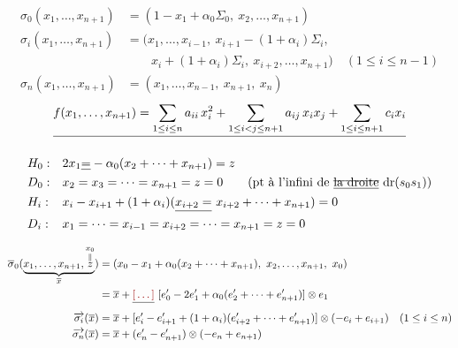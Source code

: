 \documentclass[11pt,a4paper]{article}
\begin{document}
\[
\begin{aligned}
\sigma_0(x_1, \dots, x_{n+1}) &= (1 - x_1 + \alpha_0\Sigma_0,\ x_2, \dots, x_{n+1})\\
\sigma_i(x_1, \dots, x_{n+1}) &= (x_1, \dots, x_{i-1},\ x_{i+1} - (1+\alpha_i)\Sigma_i,\\
&\qquad x_i + (1+\alpha_i)\Sigma_i,\ x_{i+2}, \dots, x_{n+1}) \quad (1\le i\le n-1)\\
\sigma_n(x_1, \dots, x_{n+1}) &= (x_1, \dots, x_{n-1},\ x_{n+1},\ x_n)
\end{aligned}
\]
\[
\struck{f(x_1, \dots, x_{n+1}) = \sum_{1\le i\le n} a_{ii}\, x_i^2 + \sum_{1\le i<j\le n+1} a_{ij}\, x_i x_j + \sum_{1\le i\le n+1} c_i x_i}
\]

\[
\begin{array}{ll}
H_0 : & 2x_1 \struck{=} - \alpha_0(x_2 + \cdots + x_{n+1}) = z\\
D_0 : & x_2 = x_3 = \cdots = x_{n+1} = z = 0 \qquad (\text{pt à l'infini de } \struck{\text{\uncertain{la droite}}}\ \mathrm{dr}(s_0 s_1))\\[4pt]
H_i : & x_i - x_{i+1} + (1+\alpha_i)(\struck{x_{i+2} =}\ x_{i+2} + \cdots + x_{n+1}) = 0\\
D_i : & x_1 = \cdots = x_{i-1} = x_{i+2} = \cdots = x_{n+1} = z = 0
\end{array}
\]

\[
\begin{aligned}
\overline{\sigma}_0(\underbrace{x_1, \dots, x_{n+1}, \overset{x_0}{\overset{\|}{z}}}_{\overline{x}}) &= (x_0 - x_1 + \alpha_0(x_2 + \cdots + x_{n+1}),\ x_2, \dots, x_{n+1},\ x_0)\\
&= \overline{x} + \struck{\ill{}}\ [e'_0 - 2e'_1 + \alpha_0(e'_2 + \cdots + e'_{n+1})] \otimes e_1\\
\overrightarrow{\sigma_i}(\overline{x}) &= \overline{x} + [e'_i - e'_{i+1} + (1+\alpha_i)(e'_{i+2} + \cdots + e'_{n+1})] \otimes (-e_i + e_{i+1}) \quad (1\le i\le n)\\
\overrightarrow{\sigma_n}(\overline{x}) &= \overline{x} + (e'_n - e'_{n+1}) \otimes (-e_n + e_{n+1})
\end{aligned}
\]
\end{document}
